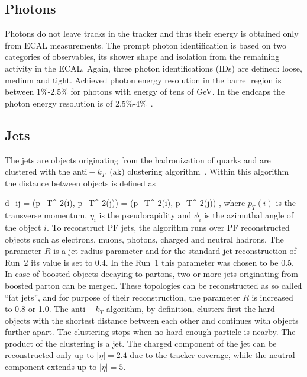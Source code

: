 

\subsection{Photons}

Photons do not leave tracks in the tracker and thus their energy is obtained only from ECAL measurements. The prompt photon identification is based on two categories of observables, its shower shape and isolation from the remaining activity in the ECAL. Again, three photon identifications (IDs) are defined: loose, medium and tight. Achieved photon energy resolution in the barrel region is between 1\%-2.5\% for photons with energy of tens of GeV. In the endcaps the photon energy resolution is of 2.5\%-4\%~\cite{CMS:EGM-14-001}.

\subsection{Jets}

The jets are objects originating from the hadronization of quarks and are clustered with the $\mathrm{anti-}k_{T}$~(ak) clustering algorithm~\cite{Cacciari:2008gp, Cacciari:2011ma}. Within this algorithm the distance between objects is defined as

{   
    d_{ij} = ({p_{T}}^{-2}(i), {p_{T}}^{-2}(j))  =  ({p_{T}}^{-2}(i), {p_{T}}^{-2}(j)) ,
}
where $p_{T}(i)$ is the transverse momentum, $\eta_{i}$ is the pseudorapidity and $\phi_{i}$ is the azimuthal angle of the object $i$. To reconstruct PF jets, the algorithm runs over PF reconstructed objects such as electrons, muons, photons, charged and neutral hadrons. The parameter $R$ is a jet radius parameter and for the standard jet reconstruction of Run~2 its value is set to 0.4. In the Run~1 this parameter was chosen to be 0.5. In case of boosted objects decaying to partons, two or more jets originating from boosted parton can be merged. These topologies can be reconstructed as so called ``fat jets'', and for purpose of their reconstruction, the parameter $R$ is increased to 0.8 or 1.0. The $\mathrm{anti-}k_{T}$ algorithm, by definition, clusters first the hard objects with the shortest distance between each other and continues with objects further apart. The clustering stops when no hard enough particle is nearby. The product of the clustering is a jet. The charged component of the jet can be reconstructed only up to $|\eta|=2.4$ due to the tracker coverage, while the neutral component extends up to  $|\eta|=5$.

